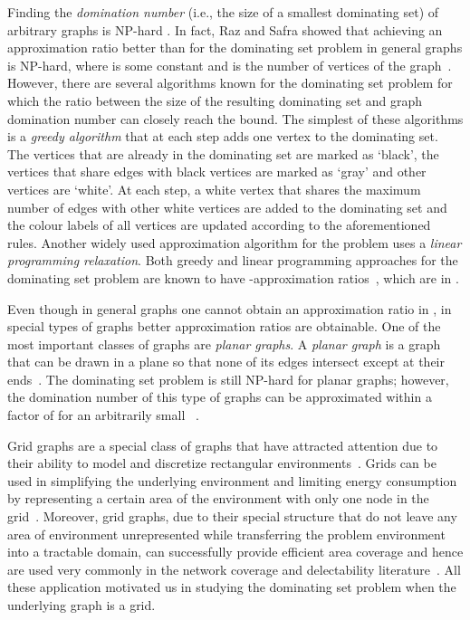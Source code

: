 \documentclass[letterpaper, 10pt, conference]{ieeeconf}
\theoremstyle{definition}
\theoremstyle{remark}
\begin{document}
Finding the {\it domination number} (i.e., the size of a smallest dominating set) of arbitrary graphs is NP-hard \cite{GJ'79}. In fact, Raz and Safra showed that achieving an approximation ratio better than  for the dominating set problem in general graphs is NP-hard, where  is some constant and  is the number of vertices of the graph~\cite{RazSaf'97}. 
However, there are several algorithms known for the dominating set problem for which the ratio between the size of the resulting dominating set and graph domination number can closely reach the  bound. The simplest of these algorithms is a \emph{greedy algorithm} that at each step adds one vertex to the dominating set. The vertices that are already in the dominating set are marked as `black', the vertices that share edges with black vertices are marked as `gray' and other vertices are `white'. At each step, a white vertex that shares the maximum number of edges with other white vertices are added to the dominating set and the colour labels of all vertices are updated according to the aforementioned rules. Another widely used approximation algorithm for the problem uses a \emph{linear programming relaxation}. Both greedy and linear programming approaches for the dominating set problem are known to have -approximation ratios~\cite{Johnson'74,lovasz'75}, which are in .

Even though in general graphs one cannot obtain an approximation ratio in , in special types of graphs better approximation ratios are obtainable. One of the most important classes of graphs are \emph{planar graphs}. A \emph{planar graph} is a graph that can be drawn in a plane so that none of its edges intersect except at their ends~\cite{BM'08}. The dominating set problem is still NP-hard for planar graphs; however, the domination number of this type of graphs can be approximated within a factor of  for an arbitrarily small ~\cite{Baker'94}. 

Grid graphs are a special class of graphs that have attracted attention due to their ability to model and discretize rectangular environments~\cite{LBTD'03,LJDKM'00}.
Grids can be  used in simplifying the underlying environment and limiting energy consumption by representing a certain area of the environment with only one node in the grid~\cite{BJDMTACX'05}. Moreover, grid graphs, due to their special structure that do not leave any area of environment unrepresented while transferring the problem environment into a tractable domain, can successfully provide efficient area coverage and hence are used very commonly in the network coverage and delectability literature~\cite{LBTD'03,CW'04}. All these application motivated us in studying the dominating set problem when the underlying graph is a grid.
\end{document}
